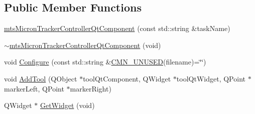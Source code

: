 \subsection*{Public Member Functions}
\begin{DoxyCompactItemize}
\item 
\hyperlink{classmts_micron_tracker_controller_qt_component_aac0e38ca9caced66a923669ca69e4ee1}{mts\+Micron\+Tracker\+Controller\+Qt\+Component} (const std\+::string \&task\+Name)
\item 
\hyperlink{classmts_micron_tracker_controller_qt_component_a0937bfd4d0acfa21bbb3a298e55c5f5e}{$\sim$mts\+Micron\+Tracker\+Controller\+Qt\+Component} (void)
\item 
void \hyperlink{classmts_micron_tracker_controller_qt_component_aecb249c8f83d2127298877585dcf0084}{Configure} (const std\+::string \&\hyperlink{cmn_portability_8h_a021894e2626935fa2305434b1e893ff6}{C\+M\+N\+\_\+\+U\+N\+U\+S\+E\+D}(filename)=\char`\"{}\char`\"{})
\item 
void \hyperlink{classmts_micron_tracker_controller_qt_component_a940b3d0e9a62b0231de067aea6b12f6d}{Add\+Tool} (Q\+Object $\ast$tool\+Qt\+Component, Q\+Widget $\ast$tool\+Qt\+Widget, Q\+Point $\ast$marker\+Left, Q\+Point $\ast$marker\+Right)
\item 
Q\+Widget $\ast$ \hyperlink{classmts_micron_tracker_controller_qt_component_a35826c5cef11e71a5485a3d409a1cb4e}{Get\+Widget} (void)
\end{DoxyCompactItemize}
